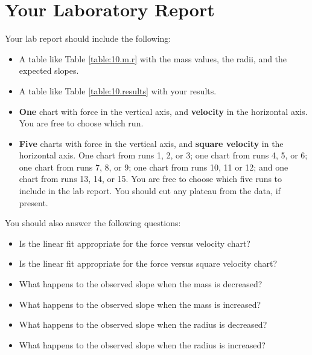 \section{Your Laboratory Report}
Your lab report should include the following:
\begin{itemize}
    \item A table like Table \ref{table:10.m.r} with the mass values, the radii, and the expected slopes.
    \item A table like Table \ref{table:10.results} with your results.
    \item \textbf{One} chart with force in the vertical axis, and \textbf{velocity} in the horizontal axis. You are free to choose which run.
    \item \textbf{Five} charts with force in the vertical axis, and \textbf{square velocity} in the horizontal axis. One chart from runs 1, 2, or 3; one chart from runs 4, 5, or 6; one chart from runs 7, 8, or 9; one chart from runs 10, 11 or 12; and one chart from runs 13, 14, or 15. You are free to choose which five runs to include in the lab report. You should cut any plateau from the data, if present.
\end{itemize}
You should also answer the following questions:
\begin{itemize}
    \item Is the linear fit appropriate for the force versus velocity chart?
    \item Is the linear fit appropriate for the force versus square velocity chart?
    \item What happens to the observed slope when the mass is decreased?
    \item What happens to the observed slope when the mass is increased?
    \item What happens to the observed slope when the radius is decreased?
    \item What happens to the observed slope when the radius is increased?
\end{itemize}
\newpage
